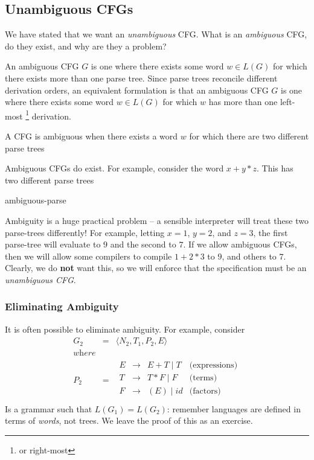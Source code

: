 \subsection{Unambiguous CFGs}\label{section:cfg-ambiguity}
We have stated that we want an \textit{unambiguous} CFG. What is an \textit{ambiguous} CFG, do they exist, and why are they a problem?

An ambiguous CFG $G$ is one where there exists some word $w \in L(G)$ for which there exists more than one parse tree. Since parse trees reconcile different derivation orders, an equivalent formulation is that an ambiguous CFG $G$ is one where there exists some word $w \in L(G)$ for which $w$ has more than one left-most \footnote{or right-most} derivation.

\begin{definition}
    A CFG is ambiguous when there exists a word $w$ for which there are two different parse trees
\end{definition}

Ambiguous CFGs do exist. For example, consider the word $x + y * z$. This has two different parse trees

{ambiguous-parse}

Ambiguity is a huge practical problem -- a sensible interpreter will treat these two parse-trees differently! For example, letting $x = 1$, $y = 2$, and $z = 3$, the first parse-tree will evaluate to $9$ and the second to $7$. If we allow ambiguous CFGs, then we will allow some compilers to compile $1 + 2 * 3$ to $9$, and others to $7$. Clearly, we do \textbf{not} want this, so we will enforce that the specification must be an \textit{unambiguous CFG}.

\subsubsection{Eliminating Ambiguity}\label{section:ambiguity-elim}
It is often possible to eliminate ambiguity. For example, consider
\[
\begin{array}{rcll}
G_2 &=& \langle N_2, T_1, P_2, E \rangle\\[1ex]
\textit{where} \\
P_2 &=& \begin{array}{rcll}
E &\to& E + T \mid T & \text{(expressions)}\\
T &\to& T * F \mid F & \text{(terms)}\\
F &\to& (E) \mid id & \text{(factors)}\\
\end{array}
\end{array}
\]
Is a grammar such that $L(G_1) = L(G_2)$: remember languages are defined in terms of \textit{words}, not trees. We leave the proof of this as an exercise.

